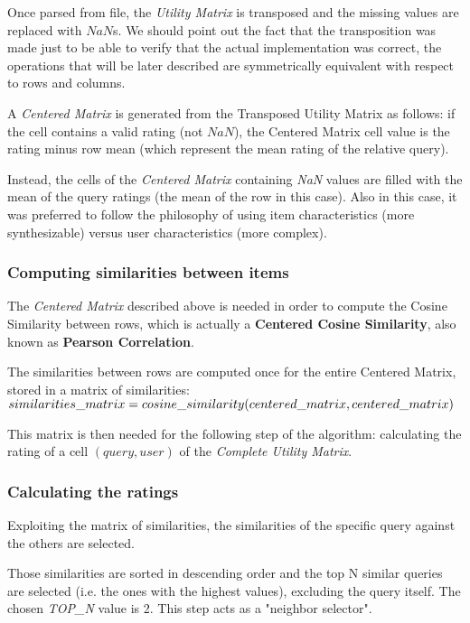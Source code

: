 Once parsed from file, the \textit{Utility Matrix} is transposed and the missing values are replaced with $NaN$s. We should point out the fact that the transposition was made just to be able to verify that the actual implementation was correct, the operations that will be later described are symmetrically equivalent with respect to rows and columns.

A \textit{Centered Matrix}  is generated from the Transposed Utility Matrix as follows: if the cell contains a valid rating (not $NaN$), the Centered Matrix cell value is the rating minus row mean (which represent the mean rating of the relative query).

Instead, the cells of the \textit{Centered Matrix} containing \textit{NaN} values are filled with the mean of the query ratings (the mean of the row in this case). Also in this case, it was preferred to follow the philosophy of using item characteristics (more synthesizable) versus user characteristics (more complex).

\subsubsection{Computing similarities between items}

The \textit{Centered Matrix} described above is needed in order to compute the Cosine Similarity between rows, which is actually a \textbf{Centered Cosine Similarity}, also known as \textbf{Pearson Correlation}.

The similarities between rows are computed once for the entire Centered Matrix, stored in a matrix of similarities: \newline
$similarities\_matrix = cosine\_similarity(centered\_matrix, \\centered\_matrix)$

This matrix is then needed for the following step of the algorithm: calculating the rating of a cell $(query, user)$ of the \textit{Complete Utility Matrix}.

\subsubsection{Calculating the ratings}

Exploiting the matrix of similarities, the similarities of the specific query against the others are selected.

Those similarities are sorted in descending order and  the top N similar queries are selected (i.e. the ones with the highest values), excluding the query itself.
The chosen \textit{TOP\_N} value is 2.
This step acts as a "neighbor selector".

